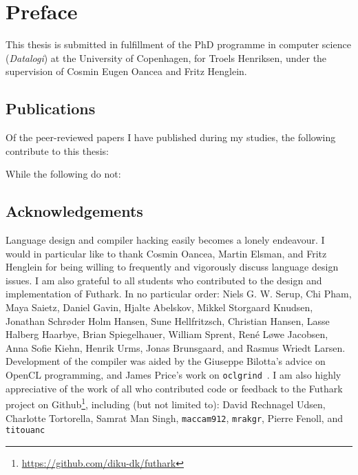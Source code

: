 {}
\chapter*{Preface}

This thesis is submitted in fulfillment of the PhD programme in
computer science (\textit{Datalogi}) at the University of Copenhagen,
for Troels Henriksen, under the supervision of Cosmin Eugen Oancea and
Fritz Henglein.

\section{Publications}

Of the peer-reviewed papers I have published during my studies, the
following contribute to this thesis:

\begin{quote}
\end{quote}
\begin{quote}
\end{quote}
\begin{quote}
\end{quote}

\noindent While the following do not:

\begin{quote}
\end{quote}
\begin{quote}
\end{quote}
\begin{quote}
\end{quote}

\section{Acknowledgements}

Language design and compiler hacking easily becomes a lonely
endeavour.  I would in particular like to thank Cosmin Oancea, Martin
Elsman, and Fritz Henglein for being willing to frequently and
vigorously discuss language design issues.  I am also grateful to all
students who contributed to the design and implementation of Futhark.
In no particular order: Niels G. W. Serup, Chi Pham, Maya Saietz,
Daniel Gavin, Hjalte Abelskov, Mikkel Storgaard Knudsen, Jonathan
Schrøder Holm Hansen, Sune Hellfritzsch, Christian Hansen, Lasse
Halberg Haarbye, Brian Spiegelhauer, William Sprent, René Løwe
Jacobsen, Anna Sofie Kiehn, Henrik Urms, Jonas Brunsgaard, and Rasmus
Wriedt Larsen.  Development of the compiler was aided by the Giuseppe
Bilotta's advice on OpenCL programming, and James Price's work on
\texttt{oclgrind}~\cite{price2015oclgrind}.  I am also highly
appreciative of the work of all who contributed code or feedback to
the Futhark project on
Github\footnote{\url{https://github.com/diku-dk/futhark}}, including
(but not limited to): David Rechnagel Udsen, Charlotte Tortorella,
Samrat Man Singh, \texttt{maccam912}, \texttt{mrakgr}, Pierre Fenoll,
and \texttt{titouanc}

